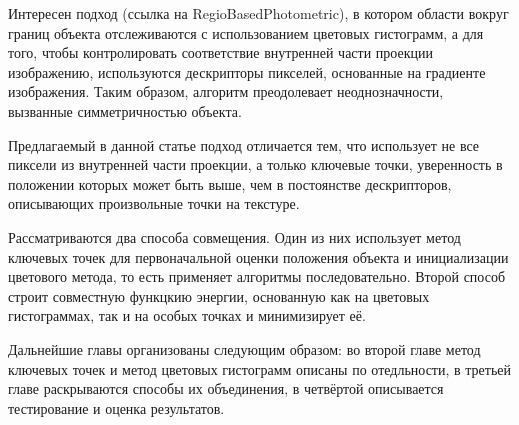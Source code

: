 Интересен подход (ссылка на RegioBasedPhotometric), в котором области вокруг границ объекта отслеживаются с использованием цветовых гистограмм, а для того, чтобы контролировать соответствие внутренней части проекции изображению, используются дескрипторы пикселей, основанные на градиенте изображения. Таким образом, алгоритм преодолевает неоднозначности, вызванные симметричностью объекта. 


Предлагаемый в данной статье подход отличается тем, что использует не все пиксели из внутренней части проекции, а только ключевые точки, уверенность в положении которых может быть выше, чем в постоянстве дескрипторов, описывающих произвольные точки на текстуре.

Рассматриваются два способа совмещения. Один из них использует метод ключевых точек для первоначальной оценки положения объекта и инициализации цветового метода, то есть применяет алгоритмы последовательно. Второй способ строит совместную функцкию энергии, основанную как на цветовых гистограммах, так и на особых точках и минимизирует её.

Дальнейшие главы организованы следующим образом: во второй главе метод ключевых точек и метод цветовых гистограмм описаны по отедльности, в третьей главе раскрываются способы их объединения, в четвёртой описывается тестирование и оценка результатов. 